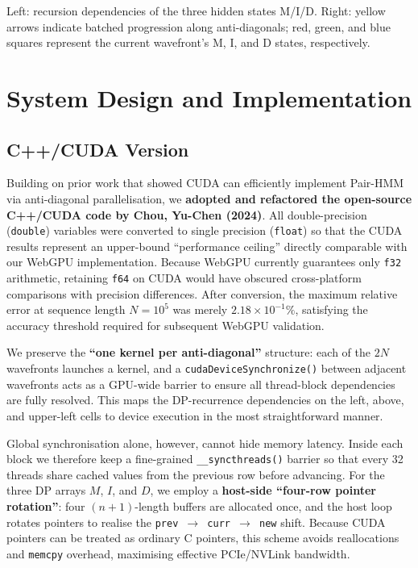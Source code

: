 \documentclass[PhD]{PHlab-thesis}
\begin{document}
Left: recursion dependencies of the three hidden states M/I/D. Right: yellow arrows indicate batched progression along anti-diagonals; red, green, and blue squares represent the current wavefront’s M, I, and D states, respectively.

\section{System Design and Implementation}
\subsection{C++/CUDA Version}
Building on prior work that showed CUDA can efficiently implement Pair-HMM via anti-diagonal parallelisation, we \textbf{adopted and refactored the open-source C++/CUDA code by Chou, Yu-Chen (2024)}. All double-precision (\texttt{double}) variables were converted to single precision (\texttt{float}) so that the CUDA results represent an upper-bound ``performance ceiling'' directly comparable with our WebGPU implementation. Because WebGPU currently guarantees only \texttt{f32} arithmetic, retaining \texttt{f64} on CUDA would have obscured cross-platform comparisons with precision differences. After conversion, the maximum relative error at sequence length $N = 10^5$ was merely $2.18 \times 10^{-1}\%$, satisfying the accuracy threshold required for subsequent WebGPU validation.

We preserve the \textbf{``one kernel per anti-diagonal''} structure: each of the $2N$ wavefronts launches a kernel, and a \texttt{cudaDeviceSynchronize()} between adjacent wavefronts acts as a GPU-wide barrier to ensure all thread-block dependencies are fully resolved. This maps the DP-recurrence dependencies on the left, above, and upper-left cells to device execution in the most straightforward manner.

Global synchronisation alone, however, cannot hide memory latency. Inside each block we therefore keep a fine-grained \texttt{\_\_syncthreads()} barrier so that every 32 threads share cached values from the previous row before advancing. For the three DP arrays $M$, $I$, and $D$, we employ a \textbf{host-side ``four-row pointer rotation''}: four $(n+1)$-length buffers are allocated once, and the host loop rotates pointers to realise the \texttt{prev $\rightarrow$ curr $\rightarrow$ new} shift. Because CUDA pointers can be treated as ordinary C pointers, this scheme avoids reallocations and \texttt{memcpy} overhead, maximising effective PCIe/NVLink bandwidth.
\end{document}
